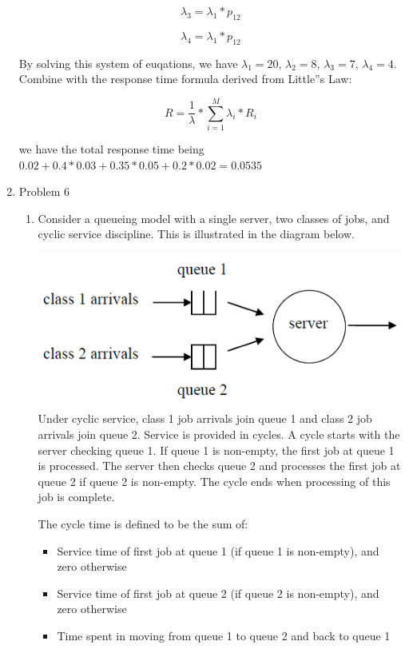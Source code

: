 \documentclass[12pt]{article}
\begin{document}
\begin{enumerate}
\begin{equation}
\lambda_3 = \lambda_1 * p_{12}
\end{equation}

\begin{equation}
\lambda_4 = \lambda_1 * p_{12}
\end{equation}

By solving this system of euqations, we have $\lambda_1 = 20$, $\lambda_2 = 8$, $\lambda_3 = 7$, $\lambda_4 = 4$. Combine with the response time formula derived from Little''s Law:

\begin{equation}
R = \frac{1}{\lambda} * \sum_{i=1}^{M}{\lambda_i * R_i}
\end{equation}

we have the total response time being $0.02 + 0.4 * 0.03 + 0.35 * 0.05 + 0.2 * 0.02 = 0.0535$

\item{Problem 6}

\begin{enumerate}
\item{} Consider a queueing model with a single server, two classes of jobs, and cyclic service discipline. This is illustrated in the diagram below.

\includegraphics{a1q6.png}
Under cyclic service, class 1 job arrivals join queue 1 and class 2 job arrivals join queue 2. Service is provided in cycles. A cycle starts with the server checking queue 1. If queue 1 is non-empty, the first job at queue 1 is processed. The server then checks queue 2 and processes the first job at queue 2 if queue 2 is non-empty. The cycle ends when processing of this job is complete.

The cycle time is defined to be the sum of:
\begin{itemize}
\item{} Service time of first job at queue 1 (if queue 1 is non-empty), and zero otherwise
\item{} Service time of first job at queue 2 (if queue 2 is non-empty), and zero otherwise
\item{} Time spent in moving from queue 1 to queue 2 and back to queue 1
\end{itemize}


\end{enumerate}
\end{enumerate}
\end{document}
